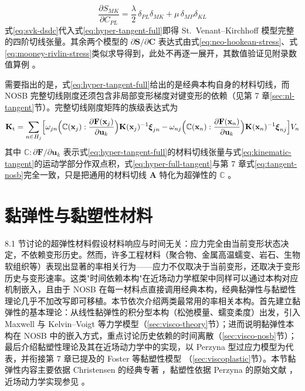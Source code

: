 \begin{equation}
  \frac{\partial S_{MK}}{\partial C_{PL}}
  =\frac{\lambda}{2}\,\delta_{PL}\delta_{MK}+\mu\,\delta_{MP}\delta_{KL}
  \label{eq:svk-dsdc}
\end{equation}
式\eqref{eq:svk-dsdc}代入式\eqref{eq:hyper-tangent-full}即得 St.~Venant--Kirchhoff 模型完整的四阶切线张量。其余两个模型的 $\partial\mathbf{S}/\partial\mathbf{C}$ 表达式由式\eqref{eq:neo-hookean-stress}、式\eqref{eq:mooney-rivlin-stress}类似求导得到，此处不再逐一展开，其数值验证见附录数值算例 \cite{SimoHughes1998}。

需要指出的是，式\eqref{eq:hyper-tangent-full}给出的是经典本构自身的材料切线，而 NOSB 完整切线刚度还须包含非局部变形梯度对键变形的依赖（见第 7 章\ref{sec:nl-tangent}节）。完整切线刚度矩阵的族级表达式为
\begin{equation}
  \mathbf{K}_{\mathrm{t}}
  =\sum_{n\in H_{j}}\Bigl[
    \omega_{jn}\Bigl(\mathbb{C}(\mathbf{x}_{j}):
    \frac{\partial\mathbf{F}(\mathbf{x}_{j})}{\partial\mathbf{u}_{k}}\Bigr)
    \mathbf{K}(\mathbf{x}_{j})^{-1}\boldsymbol{\xi}_{jn}
    -\omega_{nj}\Bigl(\mathbb{C}(\mathbf{x}_{n}):
    \frac{\partial\mathbf{F}(\mathbf{x}_{n})}{\partial\mathbf{u}_{k}}\Bigr)
    \mathbf{K}(\mathbf{x}_{n})^{-1}\boldsymbol{\xi}_{nj}\Bigr]V_{n}
  \label{eq:hyper-full-tangent}
\end{equation}
其中 $\mathbb{C}:\partial\mathbf{F}/\partial\mathbf{u}_{k}$ 表示式\eqref{eq:hyper-tangent-full}的材料切线张量与式\eqref{eq:kinematic-tangent}的运动学部分作双点积，式\eqref{eq:hyper-full-tangent}与第 7 章式\eqref{eq:tangent-nosb}完全一致，只是把通用的材料切线 $\mathbf{A}$ 特化为超弹性的 $\mathbb{C}$ \cite{Hashim2020}。

\section{黏弹性与黏塑性材料}\label{sec:visco}

8.1 节讨论的超弹性材料假设材料响应与时间无关：应力完全由当前变形状态决定，不依赖变形历史。然而，许多工程材料（聚合物、金属高温蠕变、岩石、生物软组织等）表现出显著的率相关行为——应力不仅取决于当前变形，还取决于变形历史与变形速率。这类"时间依赖本构"在近场动力学框架中同样可以通过本构对应机制嵌入，且由于 NOSB 在每一材料点直接调用经典本构，经典黏弹性与黏塑性理论几乎不加改写即可移植。本节依次介绍两类最常用的率相关本构。首先建立黏弹性的基本理论：从线性黏弹性的积分型本构（松弛模量、蠕变柔度）出发，引入 Maxwell 与 Kelvin--Voigt 等力学模型（\ref{sec:visco-theory}节）；进而说明黏弹性本构在 NOSB 中的嵌入方式，重点讨论历史依赖的时间离散（\ref{sec:visco-nosb}节）；最后介绍黏塑性理论及其在近场动力学中的实现，以 Perzyna 型过应力模型为代表，并衔接第 7 章已提及的 Foster 等黏塑性模型 \cite{Foster2010}（\ref{sec:viscoplastic}节）。本节黏弹性内容主要依据 Christensen 的经典专著 \cite{Christensen1982}，黏塑性依据 Perzyna 的原始文献 \cite{Perzyna1966}，近场动力学实现参见 \cite{Foster2010,Galadima2024}。

